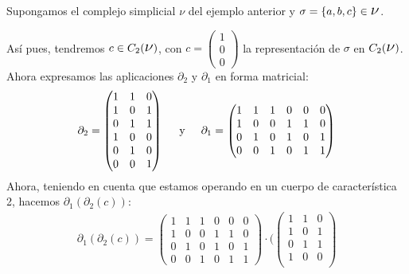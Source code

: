 \documentclass[12pt, a4paper]{article}
\numberwithin{equation}{section}
\theoremstyle{definition}
\newenvironment{ejem}
  {\pushQED{\qed}\renewcommand{\qedsymbol}{$\blacktriangleleft$}\ejemplo}
  {\popQED\endejemplo}
\theoremstyle{remark}
\theoremstyle{plain}
\begin{document}
	\begin{ejem}
		Supongamos el complejo simplicial {\Large $\nu$} del ejemplo 
		anterior y $\sigma = \{a,b,c\} \in \text{{\Large $\nu$}}$.

		Así pues, tendremos $c \in C_{2}(\text{{\Large $\nu$}})$, con
		$c=\begin{pmatrix}
			1 \\
			0 \\
			0 
		\end{pmatrix}$ la representación de $\sigma$ en $C_{2}(
		\text{{\Large $\nu$}})$. Ahora expresamos las aplicaciones 
		$\partial_{2}$ y $\partial_{1}$ en forma matricial:
		\begin{equation*}
			\partial_{2}= \begin{pmatrix}
				1 & 1 & 0 \\
				1 & 0 & 1 \\
				0 & 1 & 1 \\
				1 & 0 & 0 \\
				0 & 1 & 0 \\
				0 & 0 & 1
			\end{pmatrix}
			\hspace{0.5cm}\text{y}\hspace{0.5cm}
			\partial_{1}= \begin{pmatrix}
				1 & 1 & 1 & 0 & 0 &0 \\
				1 & 0 & 0 & 1 & 1 &0 \\
				0 & 1 & 0 & 1 & 0 &1 \\
				0 & 0 & 1 & 0 & 1 &1
			\end{pmatrix}
		\end{equation*}
		Ahora, teniendo en cuenta que estamos operando en un cuerpo de 
		característica 2, hacemos $\partial_{1}(\partial_{2}(c))$:
		\begin{equation*}
			\begin{split}
				\partial_{1}(\partial_{2}(c))=\begin{pmatrix}
				1 & 1 & 1 & 0 & 0 &0 \\
				1 & 0 & 0 & 1 & 1 &0 \\
				0 & 1 & 0 & 1 & 0 &1 \\
				0 & 0 & 1 & 0 & 1 &1
			\end{pmatrix}\cdot \Bigg( 
				\begin{pmatrix}
				1 & 1 & 0 \\
				1 & 0 & 1 \\
				0 & 1 & 1 \\
				1 & 0 & 0 \\

\end{pmatrix}
\end{split}
\end{equation*}
\end{ejem}
\end{document}
